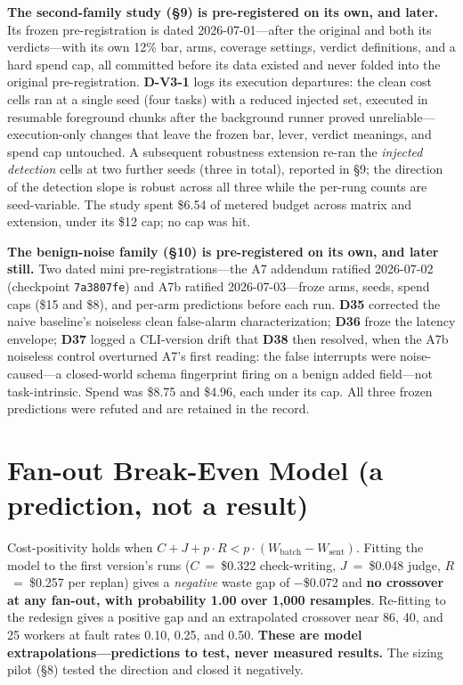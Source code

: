 \documentclass[acmsmall,screen]{acmart}
\begin{document}
\textbf{The second-family study (\S9) is pre-registered on its own, and later.}
Its frozen pre-registration is dated 2026-07-01---after the original and both its
verdicts---with its own 12\% bar, arms, coverage settings, verdict definitions,
and a hard spend cap, all committed before its data existed and never folded into
the original pre-registration. \textbf{D-V3-1} logs its execution departures: the
clean cost cells ran at a single seed (four tasks) with a reduced injected set,
executed in resumable foreground chunks after the background runner proved
unreliable---execution-only changes that leave the frozen bar, lever, verdict
meanings, and spend cap untouched. A subsequent robustness extension re-ran the
\emph{injected detection} cells at two further seeds (three in total), reported in
\S9; the direction of the detection slope is robust across all three while the
per-rung counts are seed-variable. The study spent \$6.54 of metered budget across
matrix and extension, under its \$12 cap; no cap was hit.

\textbf{The benign-noise family (\S10) is pre-registered on its own, and later
still.} Two dated mini pre-registrations---the A7 addendum ratified 2026-07-02
(checkpoint \texttt{7a3807fe}) and A7b ratified 2026-07-03---froze arms, seeds,
spend caps (\$15 and \$8), and per-arm predictions before each run. \textbf{D35}
corrected the naive baseline's noiseless clean false-alarm characterization;
\textbf{D36} froze the latency envelope; \textbf{D37} logged a CLI-version drift
that \textbf{D38} then resolved, when the A7b noiseless control overturned A7's
first reading: the false interrupts were noise-caused---a closed-world schema
fingerprint firing on a benign added field---not task-intrinsic. Spend was \$8.75
and \$4.96, each under its cap. All three frozen predictions were refuted and are
retained in the record.

\section{Fan-out Break-Even Model (a prediction, not a result)}
Cost-positivity holds when
$C + J + p\cdot R < p\cdot(W_{\mathrm{batch}} - W_{\mathrm{sent}})$. Fitting the
model to the first version's runs ($C$~=~\$0.322 check-writing, $J$~=~\$0.048
judge, $R$~=~\$0.257 per replan) gives a \emph{negative} waste gap of
$-$\$0.072 and \textbf{no crossover at any fan-out, with probability 1.00 over
1,000 resamples}. Re-fitting to the redesign gives a positive gap and an
extrapolated crossover near 86, 40, and 25 workers at fault rates 0.10, 0.25,
and 0.50. \textbf{These are model extrapolations---predictions to test, never
measured results.} The sizing pilot (\S8) tested the direction and closed it
negatively.
\end{document}
